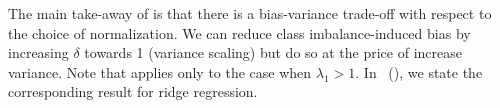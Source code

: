 The main take-away of  is that there
is a bias-variance trade-off with respect to the choice of normalization. We can reduce
class imbalance-induced bias by increasing \(\delta\) towards 1 (variance scaling) but do
so at the price of increase variance. Note that  applies
only to the case when \(\lambda_1 > 1\). In
~(), we state the corresponding result
for ridge regression.




